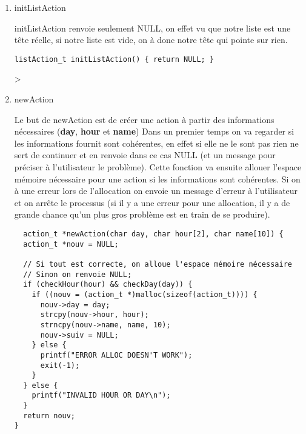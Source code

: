 \documentclass[11pt]{article}
\begin{document}
\begin{enumerate}
\item initListAction
\label{sec:orgd544d92}

initListAction renvoie seulement NULL, on effet vu que notre liste est une
tête réelle, si notre liste est vide, on à donc notre tête qui pointe sur
rien.

\begin{lstlisting}
listAction_t initListAction() { return NULL; }
\end{lstlisting}
>


\item newAction
\label{sec:org54ece7a}

Le but de newAction est de créer une action à partir des informations
nécessaires
(\textbf{day}, \textbf{hour} et \textbf{name})
Dans un premier temps on va regarder si les informations fournit sont
cohérentes, en effet si elle ne le sont pas rien ne sert de continuer et en
renvoie dans ce cas NULL (et un message pour préciser à l'utilisateur le
problème).
Cette fonction va ensuite allouer l'espace mémoire nécessaire pour une
action si les informations sont cohérentes. Si on à une erreur lors de
l'allocation on envoie un message d'erreur à l'utilisateur et on arrête le
processus (si il y a une erreur pour une allocation, il y a de grande
chance qu'un plus gros problème est en train de se produire).

\begin{lstlisting}
  action_t *newAction(char day, char hour[2], char name[10]) {
  action_t *nouv = NULL;

  // Si tout est correcte, on alloue l'espace mémoire nécessaire
  // Sinon on renvoie NULL;
  if (checkHour(hour) && checkDay(day)) {
    if ((nouv = (action_t *)malloc(sizeof(action_t)))) {
      nouv->day = day;
      strcpy(nouv->hour, hour);
      strncpy(nouv->name, name, 10);
      nouv->suiv = NULL;
    } else {
      printf("ERROR ALLOC DOESN'T WORK");
      exit(-1);
    }
  } else {
    printf("INVALID HOUR OR DAY\n");
  }
  return nouv;
}
\end{lstlisting}



\end{enumerate}
\end{document}
